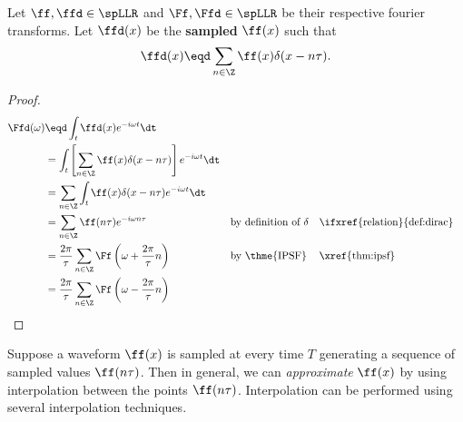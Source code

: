 \begin{theorem}
\label{thm:f_sampling}
Let $\ff,\ffd\in\spLLR$ and $\Ff,\Ffd\in\spLLR$ 
be their respective fourier transforms.
Let $\ffd(x)$ be the {\bf sampled} $\ff(x)$ such that
  \[ \ffd(x) \eqd \sum_{n\in\Z} \ff(x) \delta(x-n\tau). \]
\end{theorem}
\begin{proof}
\begin{align*}
   \Ffd(\omega) 
     &\eqd \int_t \ffd(x) e^{-i\omega t} \dt
   \\&=    \int_t \left[\sum_{n\in\Z} \ff(x) \delta(x-n\tau)\right] e^{-i\omega t} \dt
   \\&=    \sum_{n\in\Z} \int_t \ff(x) \delta(x-n\tau) e^{-i\omega t} \dt
   \\&=    \sum_{n\in\Z} \ff(n\tau) e^{-i\omega n\tau}
     &&    \text{by definition of $\delta$}
     &&    \text{\ifxref{relation}{def:dirac}}
   \\&=    \frac{2\pi}{\tau} \sum_{n\in\Z} \Ff\left(\omega + \frac{2\pi}{\tau}n \right)
     &&    \text{by \thme{IPSF}}
     &&    \text{\xref{thm:ipsf}}
   \\&=    \frac{2\pi}{\tau} \sum_{n\in\Z} \Ff\left(\omega-\frac{2\pi}{\tau}n\right)
\end{align*}
\end{proof}

Suppose a waveform $\ff(x)$ is sampled at every time $T$
generating a sequence of sampled values $\ff(n\tau)$.
Then in general, we can {\em approximate} $\ff(x)$ by 
using interpolation between the points $\ff(n\tau)$.
Interpolation can be performed using several interpolation techniques. %

